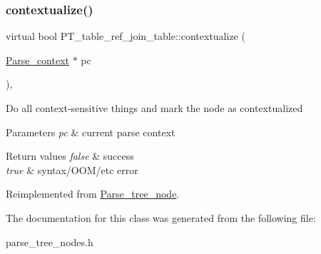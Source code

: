 \subsubsection{\texorpdfstring{contextualize()}{contextualize()}}
{\footnotesize\ttfamily virtual bool P\+T\+\_\+table\+\_\+ref\+\_\+join\+\_\+table\+::contextualize (\begin{DoxyParamCaption}\item[{\mbox{\hyperlink{structParse__context}{Parse\+\_\+context}} $\ast$}]{pc }\end{DoxyParamCaption})\hspace{0.3cm}{\ttfamily [inline]}, {\ttfamily [virtual]}}

Do all context-\/sensitive things and mark the node as contextualized


\begin{DoxyParams}{Parameters}
{\em pc} & current parse context\\
\hline
\end{DoxyParams}

\begin{DoxyRetVals}{Return values}
{\em false} & success \\
\hline
{\em true} & syntax/\+O\+O\+M/etc error \\
\hline
\end{DoxyRetVals}


Reimplemented from \mbox{\hyperlink{classParse__tree__node_a22d93524a537d0df652d7efa144f23da}{Parse\+\_\+tree\+\_\+node}}.



The documentation for this class was generated from the following file\+:\begin{DoxyCompactItemize}
\item 
parse\+\_\+tree\+\_\+nodes.\+h\end{DoxyCompactItemize}
